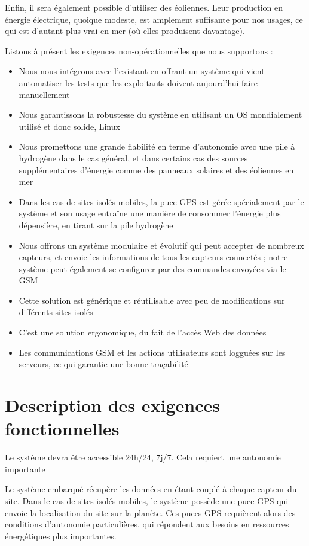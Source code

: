 Enfin, il sera également possible d’utiliser des éoliennes. Leur production en énergie électrique, quoique modeste, est amplement suffisante pour nos usages, ce qui est d’autant plus vrai en mer (où elles produisent davantage).

Listons à présent les exigences non-opérationnelles que nous supportons :

\begin{itemize}
\item Nous nous intégrons avec l’existant en offrant un système qui vient automatiser les tests que les exploitants doivent aujourd’hui faire manuellement
\item Nous garantissons la robustesse du système en utilisant un OS mondialement utilisé et donc solide, Linux
\item Nous promettons une grande fiabilité en terme d’autonomie avec une pile à hydrogène dans le cas général, et dans certains cas des sources supplémentaires d’énergie comme des panneaux solaires et des éoliennes en mer
\item Dans les cas de sites isolés mobiles, la puce GPS est gérée spécialement par le système et son usage entraîne une manière de consommer l’énergie plus dépensière, en tirant sur la pile hydrogène 
\item Nous offrons un système modulaire et évolutif qui peut accepter de nombreux capteurs, et envoie les informations de tous les capteurs connectés ; notre système peut également se configurer par des commandes envoyées via le GSM
\item Cette solution est générique et réutilisable avec peu de modifications sur différents sites isolés
\item C’est une solution ergonomique, du fait de l’accès Web des données
\item Les communications GSM et les actions utilisateurs sont logguées sur les serveurs, ce qui garantie une bonne traçabilité
\end{itemize}


\section{Description des exigences fonctionnelles}

Le système devra être accessible 24h/24, 7j/7. Cela requiert une autonomie importante

Le système embarqué récupère les données en étant couplé à chaque capteur du site. Dans le cas de sites isolés mobiles, le système possède une puce GPS qui envoie la localisation du site sur la planète. Ces puces GPS requièrent alors des conditions d’autonomie particulières, qui répondent aux besoins en ressources énergétiques plus importantes.

